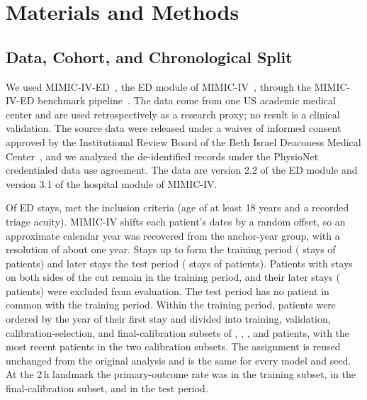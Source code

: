 \section{Materials and Methods}
\label{sec:methods}

\subsection{Data, Cohort, and Chronological Split}
\label{sec:methods-cohort}

We used MIMIC-IV-ED~\cite{johnson2023mimicived}, the ED module of MIMIC-IV~\cite{johnson2023mimiciv},
through the MIMIC-IV-ED benchmark pipeline~\cite{xie2022mimic4ed}. The data come from one US academic medical center and are used
retrospectively as a research proxy; no result is a clinical validation. The source data were released under a waiver of informed
consent approved by the Institutional Review Board of the Beth Israel Deaconess Medical Center~\cite{johnson2023mimiciv}, and we analyzed
the de-identified records under the PhysioNet credentialed data use agreement. The data are version 2.2 of the ED module and version 3.1 of the hospital module of MIMIC-IV.

Of \RVMasterStays{} ED stays, \RVEligibleStays{} met the inclusion criteria (age of at least 18 years and a recorded triage acuity).
MIMIC-IV shifts each patient's dates by a random offset, so an approximate calendar year was recovered from the anchor-year group, with a
resolution of about one year. Stays up to \RVCutYear{} form the training period (\RVTrainStays{} stays of \RVTrainPatients{} patients) and
later stays the test period (\RVTestStays{} stays of \RVTestPatients{} patients). Patients with stays on both sides of the cut remain in the
training period, and their \RVExcludedStays{} later stays (\RVExcludedPatients{} patients) were excluded from evaluation. The test period has
no patient in common with the training period. Within the training period, patients were ordered by the year of their first stay and
divided into training, validation, calibration-selection, and final-calibration subsets of \RVDevTrainPatients{}, \RVDevValPatients{},
\RVDevCsPatients{}, and \RVDevFcPatients{} patients, with the most recent patients in the two calibration subsets. The assignment is reused unchanged from the original analysis and is the same for every model and seed. At the 2\,h landmark the primary-outcome rate was \RVPrevFit{} in the training subset, \RVPrevFc{}
in the final-calibration subset, and \RVPrevTest{} in the test period.

